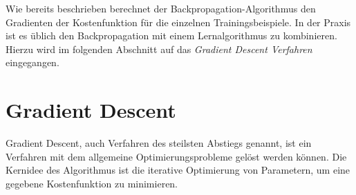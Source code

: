 \noindent
Wie bereits beschrieben berechnet der Backpropagation-Algorithmus den Gradienten der Kostenfunktion für die einzelnen Trainingsbeispiele. In der Praxis ist es üblich den Backpropagation mit einem Lernalgorithmus zu kombinieren. Hierzu wird im folgenden Abschnitt auf das \textit{Gradient Descent Verfahren} eingegangen.

\section{Gradient Descent}
Gradient Descent, auch Verfahren des steilsten Abstiegs genannt, ist ein Verfahren mit dem allgemeine Optimierungsprobleme gelöst werden können. Die Kernidee des Algorithmus ist die iterative Optimierung von Parametern, um eine gegebene Kostenfunktion zu minimieren. \\

